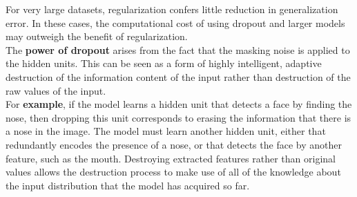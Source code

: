\begin{multicols}{2}
	For very large datasets, regularization confers little reduction in generalization error.
	In these cases, the computational cost of using dropout and larger models may outweigh the benefit of regularization.\\
	
	The \textbf{power of dropout} arises from the fact that the masking noise is applied to the hidden units.
	This can be seen as a form of highly intelligent, adaptive destruction of the information content of the input rather than destruction of the raw values of the input.\\
	For \textbf{example}, if the model learns a hidden unit that detects a face by finding the nose, then dropping this unit corresponds to erasing the information that there is a nose in the image.
	The model must learn another hidden unit, either that redundantly encodes the presence of a nose, or that detects the face by another feature, such as the mouth.
	Destroying extracted features rather than original values allows the destruction process to make use of all of the knowledge about the input distribution that the model has acquired so far.
	

\end{multicols}
